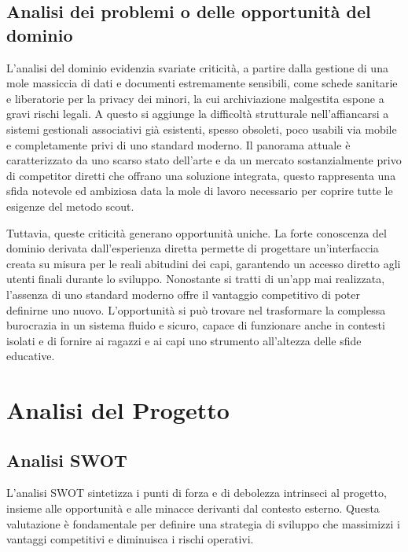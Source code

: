 \documentclass[11pt]{article}
\numberwithin{figure}{section}
\begin{document}
\subsection{Analisi dei problemi o delle opportunità del dominio}
L'analisi del dominio evidenzia svariate criticità, a partire dalla gestione di una mole massiccia di dati e documenti estremamente sensibili, come schede sanitarie e liberatorie per la privacy dei minori, la cui archiviazione malgestita espone a gravi rischi legali. A questo si aggiunge la difficoltà strutturale nell'affiancarsi a sistemi gestionali associativi già esistenti, spesso obsoleti, poco usabili via mobile e completamente privi di uno standard moderno. Il panorama attuale è caratterizzato da uno scarso stato dell'arte e da un mercato sostanzialmente privo di competitor diretti che offrano una soluzione integrata, questo rappresenta una sfida notevole ed ambiziosa data la mole di lavoro necessario per coprire tutte le esigenze del metodo scout. 

Tuttavia, queste criticità generano opportunità uniche. La forte conoscenza del dominio derivata dall'esperienza diretta permette di progettare un'interfaccia creata su misura per le reali abitudini dei capi, garantendo un accesso diretto agli utenti finali durante lo sviluppo. Nonostante si tratti di un'app mai realizzata, l'assenza di uno standard moderno offre il vantaggio competitivo di poter definirne uno nuovo. L'opportunità si può trovare nel trasformare la complessa burocrazia in un sistema fluido e sicuro, capace di funzionare anche in contesti isolati e di fornire ai ragazzi e ai capi uno strumento all'altezza delle sfide educative.

\newpage
\section{Analisi del Progetto}
\subsection{Analisi SWOT}
L'analisi SWOT sintetizza i punti di forza e di debolezza intrinseci al progetto, insieme alle opportunità e alle minacce derivanti dal contesto esterno. Questa valutazione è fondamentale per definire una strategia di sviluppo che massimizzi i vantaggi competitivi e diminuisca i rischi operativi.
\end{document}
